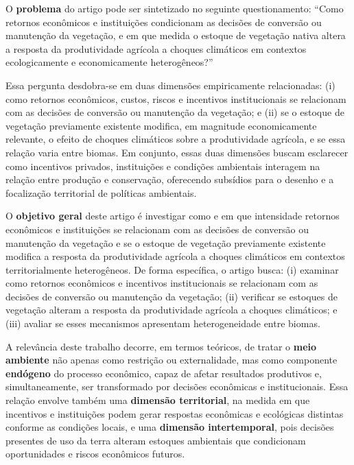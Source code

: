 O \textbf{problema} do artigo pode ser sintetizado no seguinte questionamento: “Como retornos econômicos e instituições condicionam as decisões de conversão ou manutenção da vegetação, e em que medida o estoque de vegetação nativa altera a resposta da produtividade agrícola a choques climáticos em contextos ecologicamente e economicamente heterogêneos?”

Essa pergunta desdobra-se em duas dimensões empiricamente relacionadas: (i) como retornos econômicos, custos, riscos e incentivos institucionais se relacionam com as decisões de conversão ou manutenção da vegetação; e (ii) se o estoque de vegetação previamente existente modifica, em magnitude economicamente relevante, o efeito de choques climáticos sobre a produtividade agrícola, e se essa relação varia entre biomas. Em conjunto, essas duas dimensões buscam esclarecer como incentivos privados, instituições e condições ambientais interagem na relação entre produção e conservação, oferecendo subsídios para o desenho e a focalização territorial de políticas ambientais.


O \textbf{objetivo geral} deste artigo é investigar como e em que intensidade retornos econômicos e instituições se relacionam com as decisões de conversão ou manutenção da vegetação e se o estoque de vegetação previamente existente modifica a resposta da produtividade agrícola a choques climáticos em contextos territorialmente heterogêneos. De forma específica, o artigo busca: (i) examinar como retornos econômicos e incentivos institucionais se relacionam com as decisões de conversão ou manutenção da vegetação; (ii) verificar se estoques de vegetação alteram a resposta da produtividade agrícola a choques climáticos; e (iii) avaliar se esses mecanismos apresentam heterogeneidade entre biomas.

A relevância deste trabalho decorre, em termos teóricos, de tratar o \textbf{meio ambiente} não apenas como restrição ou externalidade, mas como componente \textbf{endógeno} do processo econômico, capaz de afetar resultados produtivos e, simultaneamente, ser transformado por decisões econômicas e institucionais. Essa relação envolve também uma \textbf{dimensão territorial}, na medida em que incentivos e instituições podem gerar respostas econômicas e ecológicas distintas conforme as condições locais, e uma \textbf{dimensão intertemporal}, pois decisões presentes de uso da terra alteram estoques ambientais que condicionam oportunidades e riscos econômicos futuros. 

